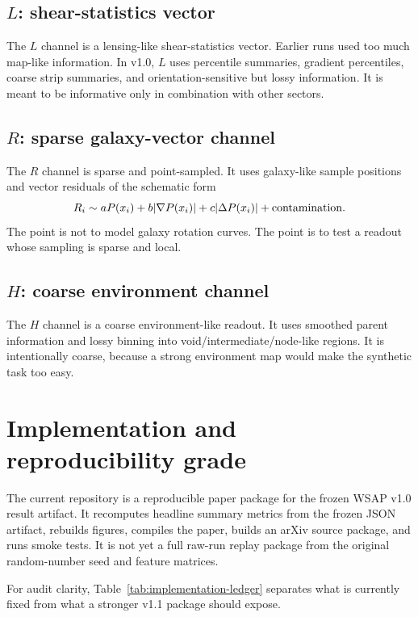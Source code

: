 \documentclass[12pt]{article}
\begin{document}
\subsection{\texorpdfstring{\(L\)}{L}: shear-statistics vector}

The \(L\) channel is a lensing-like shear-statistics vector.  Earlier runs used
too much map-like information.  In v1.0, \(L\) uses percentile summaries,
gradient percentiles, coarse strip summaries, and orientation-sensitive but
lossy information.  It is meant to be informative only in combination with
other sectors.

\subsection{\texorpdfstring{\(R\)}{R}: sparse galaxy-vector channel}

The \(R\) channel is sparse and point-sampled.  It uses galaxy-like sample
positions and vector residuals of the schematic form
\[
  R_i \sim
  aP(x_i)+b|\nabla P(x_i)|+c|\Delta P(x_i)|
  +{\rm contamination}.
\]
The point is not to model galaxy rotation curves.  The point is to test a
readout whose sampling is sparse and local.

\subsection{\texorpdfstring{\(H\)}{H}: coarse environment channel}

The \(H\) channel is a coarse environment-like readout.  It uses smoothed
parent information and lossy binning into void/intermediate/node-like regions.
It is intentionally coarse, because a strong environment map would make the
synthetic task too easy.

\section{Implementation and reproducibility grade}

The current repository is a reproducible paper package for the frozen WSAP v1.0
result artifact.  It recomputes headline summary metrics from the frozen JSON
artifact, rebuilds figures, compiles the paper, builds an arXiv source package,
and runs smoke tests.  It is not yet a full raw-run replay package from the
original random-number seed and feature matrices.

For audit clarity, Table~\ref{tab:implementation-ledger} separates what is
currently fixed from what a stronger v1.1 package should expose.
\end{document}
